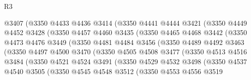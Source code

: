 \begin{lexlean}{R3}
\begin{coremodule}
                  @3407
                  (@3350
                    @4433
                    @4436
                    @3414
                    (@3350
                      @4441
                      @4444
                      @3421
                      (@3350
                        @4449
                        @4452
                        @3428
                        (@3350
                          @4457
                          @4460
                          @3435
                          (@3350
                            @4465
                            @4468
                            @3442
                            (@3350
                              @4473
                              @4476
                              @3449
                              (@3350
                                @4481
                                @4484
                                @3456
                                (@3350
                                  @4489
                                  @4492
                                  @3463
                                  (@3350
                                    @4497
                                    @4500
                                    @3470
                                    (@3350
                                      @4505
                                      @4508
                                      @3477
                                      (@3350
                                        @4513
                                        @4516
                                        @3484
                                        (@3350
                                          @4521
                                          @4524
                                          @3491
                                          (@3350
                                            @4529
                                            @4532
                                            @3498
                                            (@3350
                                              @4537
                                              @4540
                                              @3505
                                              (@3350
                                                @4545
                                                @4548
                                                @3512
                                                (@3350
                                                  @4553
                                                  @4556
                                                  @3519

\end{coremodule}
\end{lexlean}
